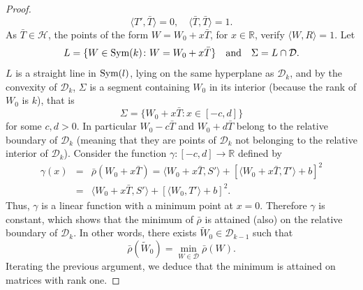 \documentclass[12pt]{amsart}
\newcommand{\R}{\mathbb R}
\newcommand{\1}{\mathbf 1}
\newcommand{\symm}{\mbox{\rm Sym}}
\begin{document}
\begin{proof}
$$
\langle T',\bar T\rangle=0,\quad \langle \bar T,\bar T\rangle=1.
$$
As $\bar T\in{\mathcal H}$, the points of the form $W=W_0+x\bar T$, for $x\in\R$, verify $\langle W,R\rangle =1$. Let
$$
L=\{W\in \symm(k)\colon W=W_0+x\bar T\}\quad\mbox{and}\quad \Sigma=L\cap{\mathcal D}.
$$
$L$ is a straight line in $\symm(l)$, lying on the same hyperplane as ${\mathcal D}_k$, and by the convexity of ${\mathcal D}_k$, $\Sigma$ is a segment containing $W_0$ in its interior (because the rank of $W_0$ is $k$), that is
$$
\Sigma=\{W_0+x\bar T\colon x\in[-c,d]\}
$$
for some $c,d>0$. In particular $W_0-c\bar T$ and $W_0+d\bar T$ belong to the relative boundary of ${\mathcal D}_k$ (meaning that they are points of ${\mathcal D}_k$ not belonging to the relative interior of ${\mathcal D}_k$). Consider the function $\gamma\colon[-c,d]\to\R$ defined by
\begin{eqnarray*}
\gamma(x)&=&\bar\rho(W_0+x\bar T)=\langle W_0+x\bar T, S'\rangle+\left[\langle W_0+x\bar T,T'\rangle +b\right]^2\\
&=&\langle W_0+x\bar T, S'\rangle+\left[\langle W_0,T'\rangle +b\right]^2.
\end{eqnarray*}
Thus, $\gamma$ is a linear function with a minimum point at $x=0$. Therefore $\gamma$ is constant, which shows that the minimum of $\bar\rho$ is attained (also) on the relative boundary of ${\mathcal D}_k$. In other words, there exists $\tilde W_0\in {\mathcal D}_{k-1}$ such that
\[
\bar\rho(\tilde W_0)=\min_{W\in {\mathcal D}}\bar\rho(W).
\]
Iterating the previous argument, we deduce that the minimum is attained on matrices with rank one.
\end{proof}
\end{document}
